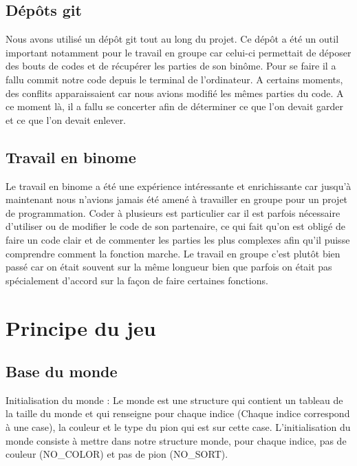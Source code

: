 \documentclass{article}
\begin{document}
\subsection{Dépôts git}

Nous avons utilisé un dépôt git tout au long du projet. Ce dépôt a été un outil important notamment pour le travail en groupe car celui-ci permettait de déposer des bouts de codes et de récupérer les parties de son binôme. Pour se faire il a fallu commit notre code depuis le terminal de l'ordinateur. A certains moments, des conflits apparaissaient car nous avions modifié les mêmes parties du code. A ce moment là, il a fallu se concerter afin de déterminer ce que l'on devait garder et ce que l'on devait enlever.

\subsection{Travail en binome}
Le travail en binome a été une expérience intéressante et enrichissante car jusqu'à maintenant nous n'avions jamais été amené à travailler en groupe pour un projet de programmation. Coder à plusieurs est particulier car il est parfois nécessaire d'utiliser ou de modifier le code de son partenaire, ce qui fait qu'on est obligé de faire un code clair et de commenter les parties les plus complexes afin qu'il puisse comprendre comment la fonction marche. Le travail en groupe c'est plutôt bien passé car on était souvent sur la même longueur bien que parfois on était pas spécialement d'accord sur la façon de faire certaines fonctions.


\section{Principe du jeu}

\subsection{Base du monde}



Initialisation du monde : Le monde est une structure qui contient un tableau de la taille du monde et qui renseigne pour chaque indice (Chaque indice correspond à une case), la couleur et le type du pion qui est sur cette case. L’initialisation du monde consiste à mettre dans notre structure monde, pour chaque indice, pas de couleur (NO\_COLOR) et pas de pion (NO\_SORT). \\
\end{document}
